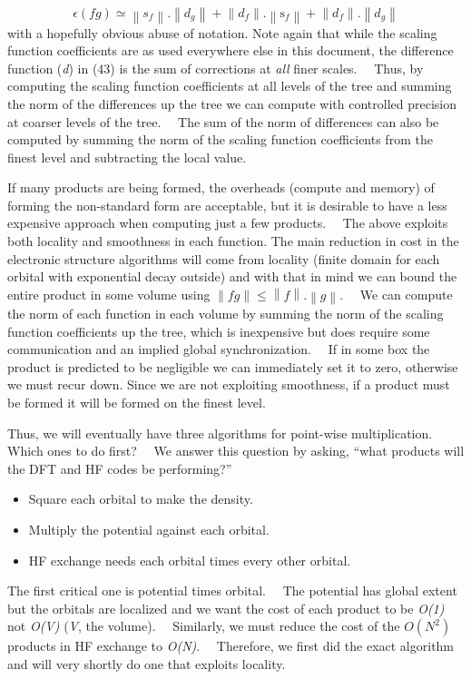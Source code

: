 \documentclass[letterpaper]{article}
\newcommand\liststyleLv{%
\renewcommand\labelitemi{${\bullet}$}
\renewcommand\labelitemii{${\circ}$}
\renewcommand\labelitemiii{${\blacksquare}$}
\renewcommand\labelitemiv{${\bullet}$}
}
\begin{document}
\begin{equation}\label{seq:refText42}
\epsilon (\mathit{fg})\simeq
\left\|s_{f}\right\|.\left\|d_{g}\right\|+\left\|d_{f}\right\|.\left\|\mathrm{{s}}_{f}\right\|+\left\|d_{f}\right\|.\left\|d_{g}\right\|
\end{equation}
with a hopefully obvious abuse of notation. Note again that while the scaling function coefficients are as used
everywhere else in this document, the difference function (\textit{d}) in (43) is the sum of corrections at \textit{all
}finer scales. \ \ Thus, by computing the scaling function coefficients at all levels of the tree and summing the norm
of the differences up the tree we can compute with controlled precision at coarser levels of the tree. \ \ The sum of
the norm of differences can also be computed by summing the norm of the scaling function coefficients from the finest
level and subtracting the local value.

If many products are being formed, the overheads (compute and memory) of forming the non-standard form are acceptable,
but it is desirable to have a less expensive approach when computing just a few products. \ \ The above exploits both
locality and smoothness in each function. The main reduction in cost in the electronic structure algorithms will come
from locality (finite domain for each orbital with exponential decay outside) and with that in mind we can bound the
entire product in some volume using  $\left\|\mathit{fg}\right\|\le \left\|f\right\|.\left\|g\right\|$. \ \ We can
compute the norm of each function in each volume by summing the norm of the scaling function coefficients up the tree,
which is inexpensive but does require some communication and an implied global synchronization. \ \ If in some box the
product is predicted to be negligible we can immediately set it to zero, otherwise we must recur down. Since we are not
exploiting smoothness, if a product must be formed it will be formed on the finest level.

Thus, we will eventually have three algorithms for point-wise multiplication. Which ones to do first? \ \ We answer this
question by asking, ``what products will the DFT and HF codes be performing?''

\liststyleLv
\begin{itemize}
\item Square each orbital to make the density.
\item Multiply the potential against each orbital.
\item HF exchange needs each orbital times every other orbital.
\end{itemize}
The first critical one is potential times orbital. \ \ The potential has global extent but the orbitals are localized
and we want the cost of each product to be \textit{O(1)} not \textit{O(V)} (\textit{V}, the volume). \ \ Similarly, we
must reduce the cost of the  $O(N^{2})$ products in HF exchange to \textit{O(N)}. \ \ Therefore, we first did the exact
algorithm and will very shortly do one that exploits locality.
\end{document}
